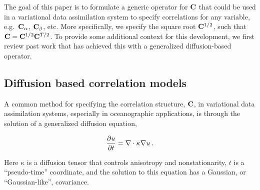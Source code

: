 The goal of this paper is to formulate a generic operator for $\mathbf{C}$
that could be
used in a variational data assimilation system to specify
correlations for any variable, e.g.\ $\mathbf{C}_\alpha$, $\mathbf{C}_\beta$, etc.
More specifically, we specify the square root $\mathbf{C}^{1/2}$, such that
$\mathbf{C} = \mathbf{C}^{1/2}\mathbf{C}^{T/2}$.
To provide some additional context for this development,
we first review past work that has achieved this with a generalized
diffusion-based operator.


\subsection{Diffusion based correlation models}
\label{ssec:wc01_review}

A common method for specifying the correlation structure,
$\mathbf{C}$, in variational data assimilation systems, especially in
oceanographic applications, is through the solution of a generalized diffusion
equation,
\begin{linenomath*}\begin{equation}
    \dfrac{\partial u}{\partial t} = \nabla \cdot \kappa \nabla u \, .
    \label{eq:diffusion}
\end{equation}\end{linenomath*}
Here $\kappa$ is a diffusion tensor that controls anisotropy and
nonstationarity, $t$ is a ``pseudo-time'' coordinate, and the solution to this
equation has a Gaussian, or ``Gaussian-like'', covariance.

